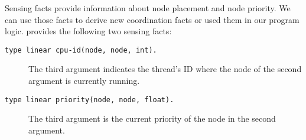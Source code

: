 Sensing facts provide information about node placement and node priority. We can use those facts
to derive new coordination facts or used them in our program logic. \lang provides the following two
sensing facts:

\begin{description}
   \item[\texttt{type linear cpu-id(node, node, int).}] The third argument indicates the thread's ID where the node of the second argument is currently running.
   \item[\texttt{type linear priority(node, node, float).}] The third argument is the current priority of the node in the second argument.
\end{description}
